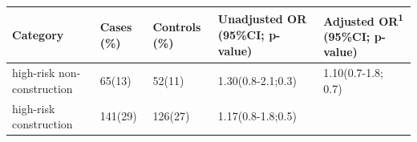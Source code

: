 \begin{longtable}[]{@{}lllll@{}}
\toprule
\begin{minipage}[b]{0.20\columnwidth}\raggedright
Category\strut
\end{minipage} & \begin{minipage}[b]{0.08\columnwidth}\raggedright
Cases (\%)\strut
\end{minipage} & \begin{minipage}[b]{0.10\columnwidth}\raggedright
Controls (\%)\strut
\end{minipage} & \begin{minipage}[b]{0.24\columnwidth}\raggedright
Unadjusted OR (95\%CI; p-value)\strut
\end{minipage} & \begin{minipage}[b]{0.23\columnwidth}\raggedright
Adjusted OR\textsuperscript{1} (95\%CI; p-value)\strut
\end{minipage}\tabularnewline
\midrule
\endhead
\begin{minipage}[t]{0.20\columnwidth}\raggedright
high-risk non-construction\strut
\end{minipage} & \begin{minipage}[t]{0.08\columnwidth}\raggedright
65(13)\strut
\end{minipage} & \begin{minipage}[t]{0.10\columnwidth}\raggedright
52(11)\strut
\end{minipage} & \begin{minipage}[t]{0.24\columnwidth}\raggedright
1.30(0.8-2.1;0.3)\strut
\end{minipage} & \begin{minipage}[t]{0.23\columnwidth}\raggedright
1.10(0.7-1.8; 0.7)\strut
\end{minipage}\tabularnewline
\begin{minipage}[t]{0.20\columnwidth}\raggedright
high-risk construction\strut
\end{minipage} & \begin{minipage}[t]{0.08\columnwidth}\raggedright
141(29)\strut
\end{minipage} & \begin{minipage}[t]{0.10\columnwidth}\raggedright
126(27)\strut
\end{minipage} & \begin{minipage}[t]{0.24\columnwidth}\raggedright
1.17(0.8-1.8;0.5)\strut
\end{minipage} & \begin{minipage}[t]{0.23\columnwidth}\raggedright

\end{minipage}
\end{longtable}
